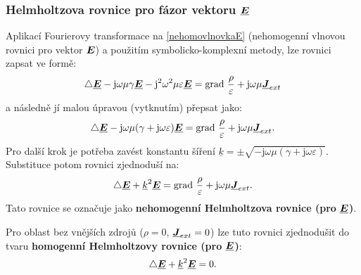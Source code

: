 \documentclass[12pt,a4paper,oneside]{article}
\numberwithin{equation}{section} %
\numberwithin{figure}{section} %
\numberwithin{table}{section} %
\newcommand{\mj}{\mathrm{j}} %
\renewcommand{\vec}[1]{\mbox{\boldmath$#1$}} %
\newcommand{\faz}[1]{{\underline{#1}}} %
\newcommand{\grad}{\mathrm{grad}\ }
\begin{document}
\subsubsection*{Helmholtzova rovnice pro fázor vektoru $\faz{\vec{E}}$}
Aplikací Fourierovy transformace na \ref{nehomovlnovkaE} (nehomogenní vlnovou rovnici pro vektor $\vec{E}$) a použitím symbolicko-komplexní metody, lze rovnici zapsat ve formě:
\begin{equation}
\triangle \faz{\vec{E}} - \mj \omega \mu \gamma \faz{\vec{E}} - \mj ^2 \omega ^2 \mu \varepsilon \faz{\vec{E}} = \grad \frac{\rho}{\varepsilon} + \mj \omega \mu \faz{\vec{J}} _{ext}
\end{equation}
a následně jí malou úpravou (vytknutím) přepsat jako:
\begin{equation}
\triangle \faz{\vec{E}} - \mj \omega \mu (\gamma + \mj \omega \varepsilon) \faz{\vec{E}} = \grad \frac{\rho}{\varepsilon} + \mj \omega \mu \faz{\vec{J}} _{ext} .
\end{equation}
Pro další krok je potřeba zavést konstantu šíření $\faz{k} = \pm \sqrt{- \mj \omega \mu (\gamma + \mj \omega \varepsilon)}$. Substituce potom rovnici zjednoduší na:
\begin{equation}
\label{HelmholtzEnehomo}
\triangle \faz{\vec{E}} + \faz{k} ^2 \faz{\vec{E}} = \grad \frac{\rho}{\varepsilon} + \mj \omega \mu \faz{\vec{J}} _{ext} .
\end{equation}
Tato rovnice se označuje jako \textbf{nehomogenní Helmholtzova rovnice (pro} $\faz{\vec{E}}$\textbf{)}.

Pro oblast bez vnějších zdrojů ($\rho = 0$, $\faz{\vec{J}} _{ext} = 0$) lze tuto rovnici zjednodušit do tvaru \textbf{homogenní Helmholtzovy rovnice (pro} $\faz{\vec{E}}$\textbf{)}:
\begin{equation}
\label{homohelmholtze}
\triangle \faz{\vec{E}} + \faz{k} ^2 \faz{\vec{E}} = 0 .
\end{equation}
\end{document}
